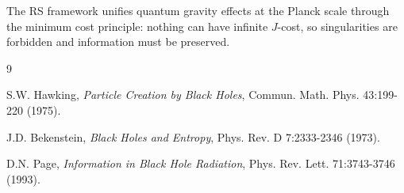 \documentclass[12pt,a4paper]{article}
\theoremstyle{definition}
\theoremstyle{remark}
\begin{document}
The RS framework unifies quantum gravity effects at the Planck scale through the 
minimum cost principle: nothing can have infinite $J$-cost, so singularities are 
forbidden and information must be preserved.

\begin{thebibliography}{9}

 S.W. Hawking, \emph{Particle Creation by Black Holes}, 
Commun. Math. Phys. 43:199-220 (1975).

 J.D. Bekenstein, \emph{Black Holes and Entropy}, 
Phys. Rev. D 7:2333-2346 (1973).

 D.N. Page, \emph{Information in Black Hole Radiation}, 
Phys. Rev. Lett. 71:3743-3746 (1993).
\end{thebibliography}
\end{document}
